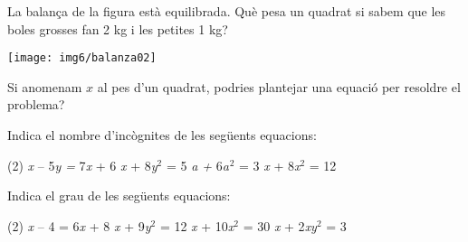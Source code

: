 \begin{mylist}




\exer  La balança de la figura està equilibrada. Què pesa un quadrat si sabem que les boles grosses fan 2 kg i les petites 1 kg?

\begin{center}
\texttt{[image: img6/balanza02]}
\end{center}

Si anomenam $x$ al pes d'un quadrat, podries plantejar una equació per resoldre el problema?


\begin{comment}
\exer  Copia en el teu quadern la següent taula i completa-la:

\begin{center}
	\renewcommand*{\arraystretch}{1.2}
\begin{longtable}{|p{1.2in}|p{1.2in}|p{1.2in}|p{1.2in}|} \hline 
\textbf{Equació} & \textbf{Primer membre} & \textbf{Segon membre} & \textbf{Incògnites} \hline 
8\textit{x} -- 1 = 4\textit{x} -- 7 &  &  &  \hline 
 & 5\textit{x} + 9 & 3\textit{x} -- 1 &  \hline 
2\textit{a +} 3 = 32 &  &  &  \hline 
 & 2\textit{x} -- 5\textit{y} & 5 + 4\textit{y} &  \hline 
\end{longtable}
\end{center}
\end{comment}

\exer \mental Indica el nombre d'incògnites de les següents equacions:
\begin{tasks}(2) 
	 \textit{x} -- 5\textit{y =} 7\textit{x} + 6  
	\textit{x }+ 8\textit{y${}^{2}$ }= 5  
	\textit{a + }6\textit{a${}^{ }$}${}^{2}$ = 3  
	\textit{x }+ 8\textit{x${}^{2}$ }= 12
\end{tasks}


\exer \mental  Indica el grau de les següents equacions:

\begin{tasks}(2)
	\textit{x} -- 4 = 6\textit{x} + 8   
	\textit{x} + 9\textit{y${}^{2}$ }= 12  
	\textit{x} + 10\textit{x${}^{2}$ }= 30  
	\textit{x} + 2\textit{xy${}^{2}$ }= 3
\end{tasks}


\end{mylist}



